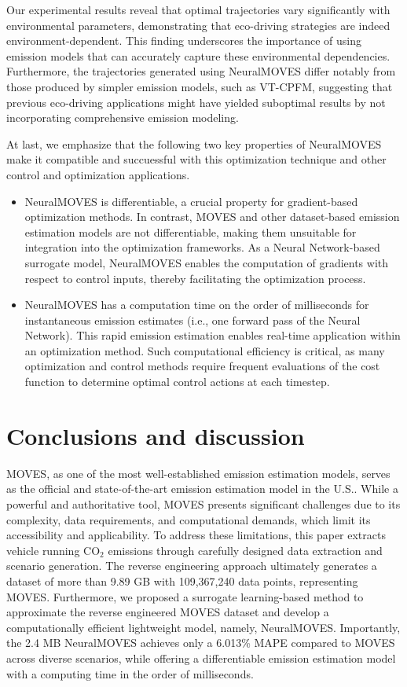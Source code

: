 \documentclass[12pt,english]{article}
\begin{document}
Our experimental results reveal that optimal trajectories vary significantly with environmental parameters, demonstrating that eco-driving strategies are indeed environment-dependent. This finding underscores the importance of using emission models that can accurately capture these environmental dependencies. Furthermore, the trajectories generated using NeuralMOVES differ notably from those produced by simpler emission models, such as VT-CPFM, suggesting that previous eco-driving applications might have yielded suboptimal results by not incorporating comprehensive emission modeling.


At last, we emphasize that the following two key properties of NeuralMOVES make it compatible and succuessful with this optimization technique and other control and optimization applications.
\begin{itemize}
    \item NeuralMOVES is differentiable, a crucial property for gradient-based optimization methods. In contrast, MOVES and other dataset-based emission estimation models are not differentiable, making them unsuitable for integration into the optimization frameworks. As a Neural Network-based surrogate model, NeuralMOVES enables the computation of gradients with respect to control inputs, thereby facilitating the optimization process.

    \item NeuralMOVES has a computation time on the order of milliseconds for instantaneous emission estimates (i.e., one forward pass of the Neural Network). This rapid emission estimation enables real-time application within an optimization method. 
    Such computational efficiency is critical, as many optimization and control methods require frequent evaluations of the cost function to determine optimal control actions at each timestep.
\end{itemize}



\section{Conclusions and discussion}\label{sec:Conclusion}


MOVES, as one of the most well-established emission estimation models, serves as the official and state-of-the-art emission estimation model in the U.S..
While a powerful and authoritative tool, MOVES presents significant challenges due to its complexity, data requirements, and computational demands, which limit its accessibility and applicability.
To address these limitations, this paper extracts vehicle running CO$_2$ emissions through carefully designed data extraction and scenario generation.
The reverse engineering approach ultimately generates a dataset of more than 9.89 GB with 109,367,240 data points, representing MOVES.
Furthermore, we proposed a surrogate learning-based method to approximate the reverse engineered MOVES dataset and develop a computationally efficient lightweight model, namely, NeuralMOVES. Importantly, the 2.4 MB NeuralMOVES achieves only a 6.013\% MAPE compared to MOVES across diverse scenarios, while offering a differentiable emission estimation model with a computing time in the order of milliseconds.
\end{document}
